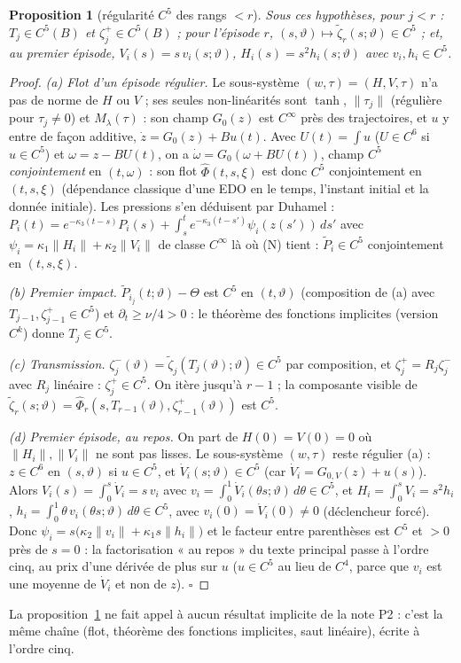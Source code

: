 \documentclass[11pt,a4paper]{article}
\newtheorem{proposition}[theoreme]{Proposition}
\theoremstyle{remark}
\newcommand{\vth}{\vartheta}
\begin{document}
\begin{proposition}[régularité $C^5$ des rangs $<r$]\label{prop:C5}
Sous ces hypothèses, pour $j<r$ : $T_j\in C^5(B)$ et $\zeta^+_j\in C^5(B)$ ; pour l'épisode $r$, $(s,\vth)\mapsto\tilde\zeta_r(s;\vth)\in C^5$ ; et, au premier épisode, $V_i(s)=s\,v_i(s;\vth)$, $H_i(s)=s^2h_i(s;\vth)$ avec $v_i,h_i\in C^5$.
\end{proposition}
\begin{proof}
\emph{(a) Flot d'un épisode régulier.} Le sous-système $(w,\tau)=(H,V,\tau)$ n'a pas de norme de $H$ ou $V$ ; ses seules non-linéarités sont $\tanh$, $\lVert\tau_j\rVert$ (régulière pour $\tau_j\ne0$) et $M_\lambda(\tau)$ : son champ $G_0(z)$ est $C^\infty$ près des trajectoires, et $u$ y entre de façon additive, $\dot z=G_0(z)+Bu(t)$. Avec $U(t)=\int u$ ($U\in C^6$ si $u\in C^5$) et $\omega=z-BU(t)$, on a $\dot\omega=G_0(\omega+BU(t))$, champ $C^5$ \emph{conjointement} en $(t,\omega)$ : son flot $\hat\Phi(t,s,\xi)$ est donc $C^5$ conjointement en $(t,s,\xi)$ (dépendance classique d'une EDO en le temps, l'instant initial et la donnée initiale). Les pressions s'en déduisent par Duhamel : $P_i(t)=e^{-\kappa_3(t-s)}P_i(s)+\int_s^te^{-\kappa_3(t-s')}\psi_i(z(s'))\,ds'$ avec $\psi_i=\kappa_1\lVert H_i\rVert+\kappa_2\lVert V_i\rVert$ de classe $C^\infty$ là où (N) tient : $\tilde P_i\in C^5$ conjointement en $(t,s,\xi)$.

\emph{(b) Premier impact.} $\tilde P_{i_j}(t;\vth)-\Theta$ est $C^5$ en $(t,\vth)$ (composition de (a) avec $T_{j-1},\zeta^+_{j-1}\in C^5$) et $\partial_t\ge\nu/4>0$ : le théorème des fonctions implicites (version $C^k$) donne $T_j\in C^5$.

\emph{(c) Transmission.} $\zeta^-_j(\vth)=\tilde\zeta_j(T_j(\vth);\vth)\in C^5$ par composition, et $\zeta^+_j=R_j\zeta^-_j$ avec $R_j$ linéaire : $\zeta^+_j\in C^5$. On itère jusqu'à $r-1$ ; la composante visible de $\tilde\zeta_r(s;\vth)=\hat\Phi_r(s,T_{r-1}(\vth),\zeta^+_{r-1}(\vth))$ est $C^5$.

\emph{(d) Premier épisode, au repos.} On part de $H(0)=V(0)=0$ où $\lVert H_i\rVert,\lVert V_i\rVert$ ne sont pas lisses. Le sous-système $(w,\tau)$ reste régulier (a) : $z\in C^6$ en $(s,\vth)$ si $u\in C^5$, et $\dot V_i(s;\vth)\in C^5$ (car $\dot V_i=G_{0,V}(z)+u(s)$). Alors $V_i(s)=\int_0^s\dot V_i=s\,v_i$ avec $v_i=\int_0^1\dot V_i(\theta s;\vth)\,d\theta\in C^5$, et $H_i=\int_0^sV_i=s^2h_i$, $h_i=\int_0^1\theta\,v_i(\theta s;\vth)\,d\theta\in C^5$, avec $v_i(0)=\dot V_i(0)\ne0$ (déclencheur forcé). Donc $\psi_i=s\bigl(\kappa_2\lVert v_i\rVert+\kappa_1s\lVert h_i\rVert\bigr)$ et le facteur entre parenthèses est $C^5$ et $>0$ près de $s=0$ : la factorisation « au repos » du texte principal passe à l'ordre cinq, au prix d'une dérivée de plus sur $u$ ($u\in C^5$ au lieu de $C^4$, parce que $v_i$ est une moyenne de $\dot V_i$ et non de $z$). $\square$
\end{proof}
La proposition~\ref{prop:C5} ne fait appel à aucun résultat implicite de la note P2 : c'est la même chaîne (flot, théorème des fonctions implicites, saut linéaire), écrite à l'ordre cinq.
\end{document}
